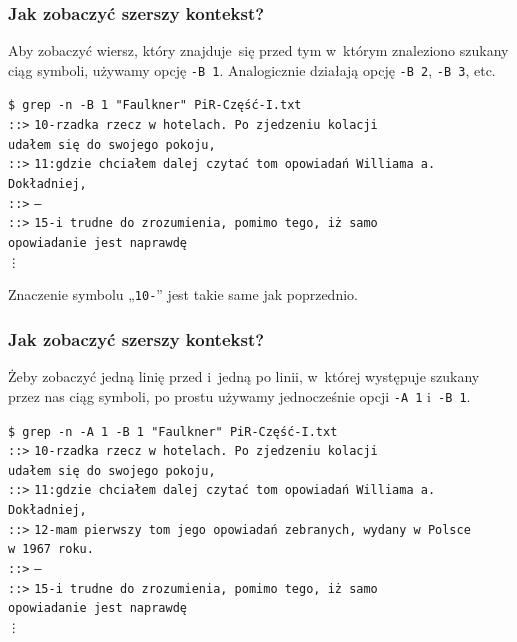 \documentclass[10pt,t]{beamer}
\begin{document}
\begin{frame}
  \frametitle{Jak zobaczyć szerszy kontekst?}


  Aby zobaczyć wiersz, który znajduje~się przed tym w~którym znaleziono
  szukany ciąg symboli, używamy opcję \texttt{-B 1}. Analogicznie działają
  opcję \texttt{-B 2}, \texttt{-B 3}, etc.

  \texttt{\$ grep -n -B 1 "Faulkner"{} PiR-Część-I.txt} \\
  \texttt{::>} \texttt{10-rzadka rzecz w hotelach. Po zjedzeniu kolacji} \\
  \texttt{udałem~się do swojego pokoju,} \\
  \texttt{::>} \texttt{11:gdzie chciałem dalej czytać tom opowiadań
    Williama a. Dokładniej,} \\
  \texttt{::>} \texttt{--} \\
  \texttt{::>} \texttt{15-i trudne do zrozumienia, pomimo tego, iż samo} \\
  \texttt{opowiadanie jest naprawdę} \\
  \hspace{2em} \texttt{\vdots}

  Znaczenie symbolu „\texttt{10-}” jest takie same jak poprzednio.

\end{frame}





\begin{frame}
  \frametitle{Jak zobaczyć szerszy kontekst?}


  Żeby zobaczyć jedną linię przed i~jedną po linii, w~której występuje
  szukany przez nas ciąg symboli, po prostu używamy jednocześnie opcji
  \texttt{-A 1} i~\texttt{-B 1}.

  \texttt{\$ grep -n -A 1 -B 1 "Faulkner"{} PiR-Część-I.txt} \\
  \texttt{::>} \texttt{10-rzadka rzecz w hotelach. Po zjedzeniu kolacji} \\
  \texttt{udałem się do swojego pokoju,} \\
  \texttt{::>} \texttt{11:gdzie chciałem dalej czytać tom opowiadań
    Williama a. Dokładniej,} \\
  \texttt{::>} \texttt{12-mam pierwszy tom jego opowiadań zebranych, wydany
    w~Polsce w~1967 roku.} \\
  \texttt{::>} \texttt{--} \\
  \texttt{::>} \texttt{15-i trudne do zrozumienia, pomimo tego, iż samo} \\
  \texttt{opowiadanie jest naprawdę} \\
  \hspace{2em} \texttt{\vdots}

\end{frame}
\end{document}
